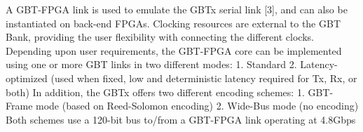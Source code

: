 A GBT-FPGA link is used to emulate the GBTx serial link [3], and can also be instantiated on back-end FPGAs. Clocking resources are external to the GBT Bank, providing the user flexibility with connecting the different clocks. Depending upon user requirements, the GBT-FPGA core can be implemented using one or more GBT links in two different modes:
1.	Standard 
2.	Latency-optimized (used when fixed, low and deterministic latency required for Tx, Rx, or both)
In addition, the GBTx offers two different encoding schemes:
1.	GBT-Frame mode (based on Reed-Solomon encoding)
2.	Wide-Bus mode (no encoding)
Both schemes use a 120-bit bus to/from a GBT-FPGA link operating at 4.8Gbps
